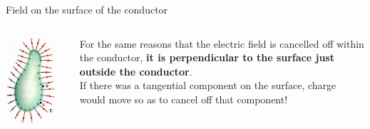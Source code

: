 \begin{frame}{Field on the surface of the conductor}

\begin{columns}
  \begin{column}{0.40\textwidth}
      \begin{center}
        \includegraphics[width=0.85\textwidth]{./images/schematics/conductor_irregular_shape_surface_field.jpg}\\
      \end{center}
  \end{column}
  \begin{column}{0.60\textwidth}
    For the same reasons that the electric field is cancelled off within the conductor,
    {\bf it is perpendicular to the surface just outside the conductor}.\\
    \vspace{0.3cm}
    If there was a tangential component on the surface,
    charge would move so as to cancel off that component!\\
  \end{column}
\end{columns}

\end{frame}


